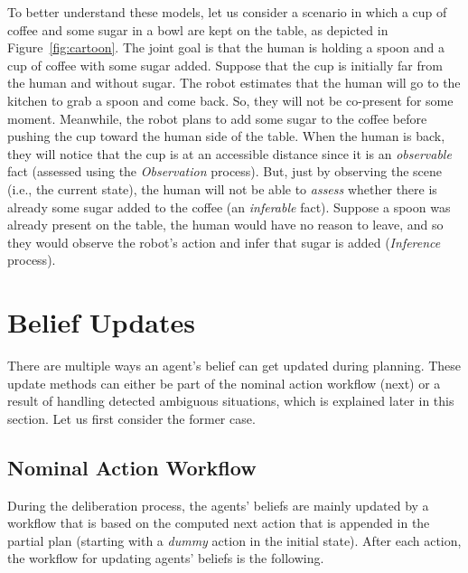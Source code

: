 \documentclass[letterpaper]{article} %
\begin{document}
To better understand these models, let
us consider a scenario in which a cup of coffee and some sugar in a bowl are kept on the table, as depicted in Figure~\ref{fig:cartoon}. The joint goal is that the human is holding a spoon and a cup of coffee with some sugar added. 
Suppose that the cup is initially far from the human and without sugar. 
The robot estimates that the human will go to the kitchen to grab a spoon and come back. So, they will not be co-present for some moment. 
Meanwhile, the robot plans to add some sugar to the coffee before pushing the cup toward the human side of the table.
When the human is back, they will notice that the cup is at an accessible distance since it is an \textit{observable} fact (assessed using the \textit{Observation} process). 
But, just by observing the scene (i.e., the current state), the human will not be able to \textit{assess} whether there is already some sugar added to the coffee (an \textit{inferable} fact). 
Suppose a spoon was already present on the table, the human would have no reason to leave, and so they would observe the robot's action and infer that sugar is added (\textit{Inference} process).


\section{Belief Updates}
There are multiple ways an agent's belief can get updated during planning. These update methods can either be part of the nominal action workflow (next) or a result of handling detected ambiguous situations, which is explained later in this section. Let us first consider the former case.

\subsection{Nominal Action Workflow}
During the deliberation process, the agents' beliefs are mainly updated by a workflow that is based on the computed next action that is appended in the partial plan (starting with a \textit{dummy} action in the initial state). 
After each action, the workflow for updating agents' beliefs is the following.
\end{document}
